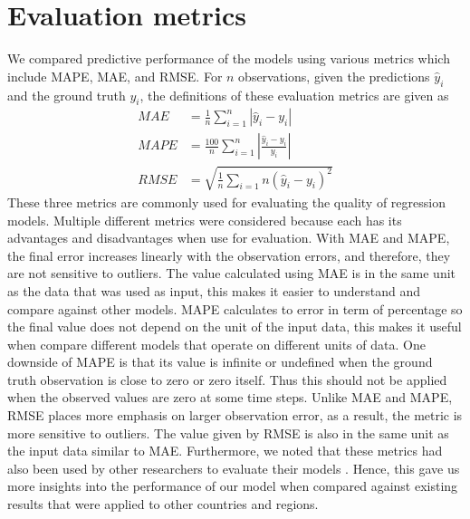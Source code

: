 \section{Evaluation metrics}
\label{sec:methodologies-evaluation-metrics}

We compared predictive performance of the models using various metrics which include \gls{MAPE}, \gls{MAE}, and \gls{RMSE}. For $n$ observations, given the predictions $\hat{y}_i$ and the ground truth $y_i$, the definitions of these evaluation metrics are given as
\begin{align*}
    MAE &= \frac{1}{n} \sum_{i=1}^n \left| \hat{y}_i - y_i \right| \\
    MAPE &= \frac{100}{n} \sum_{i=1}^n \left| \frac{\hat{y}_i - y_i}{y_i} \right| \\
    RMSE &= \sqrt{\frac{1}{n} \sum_{i=1}{n} (\hat{y}_i - y_i)^2}
\end{align*}
These three metrics are commonly used for evaluating the quality of regression models.
Multiple different metrics were considered because each has its advantages and disadvantages when use for evaluation.
With \gls{MAE} and \gls{MAPE}, the final error increases linearly with the observation errors, and therefore, they are not sensitive to outliers.
The value calculated using \gls{MAE} is in the same unit as the data that was used as input, this makes it easier to understand and compare against other models.
\gls{MAPE} calculates to error in term of percentage so the final value does not depend on the unit of the input data, this makes it useful when compare different models that operate on different units of data.
One downside of \gls{MAPE} is that its value is infinite or undefined when the ground truth observation is close to zero or zero itself.
Thus this should not be applied when the observed values are zero at some time steps.
Unlike \gls{MAE} and \gls{MAPE}, \gls{RMSE} places more emphasis on larger observation error, as a result, the metric is more sensitive to outliers.
The value given by \gls{RMSE} is also in the same unit as the input data similar to \gls{MAE}.
Furthermore, we noted that these metrics had also been used by other researchers to evaluate their models \cite{rayEnsembleForecastsCoronavirus2020, ihmecovid-19forecastingteamModelingCOVID19Scenarios2021,arikInterpretableSequenceLearning}.
Hence, this gave us more insights into the performance of our model when compared against existing results that were applied to other countries and regions.
